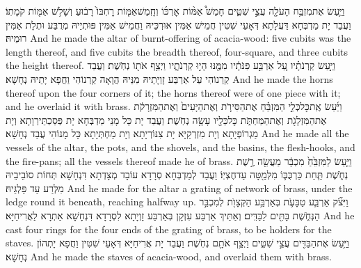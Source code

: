 \newperek
{}
{וַיַּ֛עַשׂ אֶת\maqqaf מִזְבַּ֥ח הָעֹלָ֖ה עֲצֵ֣י שִׁטִּ֑ים חָמֵשׁ֩ אַמּ֨וֹת אׇרְכּ֜וֹ וְחָֽמֵשׁ\maqqaf אַמּ֤וֹת רׇחְבּוֹ֙ רָב֔וּעַ וְשָׁלֹ֥שׁ אַמּ֖וֹת קֹמָתֽוֹ׃}
{וַעֲבַד יָת מַדְבְּחָא דַּעֲלָתָא דְּאָעֵי שִׁטִּין חֲמֵישׁ אַמִּין אוּרְכֵּיהּ וַחֲמֵישׁ אַמִּין פּוּתְיֵיהּ מְרֻבַּע וּתְלָת אַמִּין רוּמֵיהּ׃}
{And he made the altar of burnt-offering of acacia-wood: five cubits was the length thereof, and five cubits the breadth thereof, four-square, and three cubits the height thereof.}{}
{וַיַּ֣עַשׂ קַרְנֹתָ֗יו עַ֚ל אַרְבַּ֣ע פִּנֹּתָ֔יו מִמֶּ֖נּוּ הָי֣וּ קַרְנֹתָ֑יו וַיְצַ֥ף אֹת֖וֹ נְחֹֽשֶׁת׃}
{וַעֲבַד קַרְנוֹהִי עַל אַרְבַּע זָוְיָתֵיהּ מִנֵּיהּ הֲוָאָה קַרְנוֹהִי וַחֲפָא יָתֵיהּ נְחָשָׁא׃}
{And he made the horns thereof upon the four corners of it; the horns thereof were of one piece with it; and he overlaid it with brass.}{}
{וַיַּ֜עַשׂ אֶֽת\maqqaf כׇּל\maqqaf כְּלֵ֣י הַמִּזְבֵּ֗חַ אֶת\maqqaf הַסִּירֹ֤ת וְאֶת\maqqaf הַיָּעִים֙ וְאֶת\maqqaf הַמִּזְרָקֹ֔ת אֶת\maqqaf הַמִּזְלָגֹ֖ת וְאֶת\maqqaf הַמַּחְתֹּ֑ת כׇּל\maqqaf כֵּלָ֖יו עָשָׂ֥ה נְחֹֽשֶׁת׃}
{וַעֲבַד יָת כָּל מָנֵי מַדְבְּחָא יָת פְּסַכְתֵּירְוָתָא וְיָת מַגְרוֹפְיָתָא וְיָת מִזְרְקַיָּא יָת צִנּוֹרְיָתָא וְיָת מַחְתְּיָתָא כָּל מָנוֹהִי עֲבַד נְחָשָׁא׃}
{And he made all the vessels of the altar, the pots, and the shovels, and the basins, the flesh-hooks, and the fire-pans; all the vessels thereof made he of brass.}{}
{וַיַּ֤עַשׂ לַמִּזְבֵּ֙חַ֙ מִכְבָּ֔ר מַעֲשֵׂ֖ה רֶ֣שֶׁת נְחֹ֑שֶׁת תַּ֧חַת כַּרְכֻּבּ֛וֹ מִלְּמַ֖טָּה עַד\maqqaf חֶצְיֽוֹ׃}
{וַעֲבַד לְמַדְבְּחָא סְרָדָא עוֹבָד מְצָדְתָא דִּנְחָשָׁא תְּחוֹת סוֹבֵיבֵיהּ מִלְּרַע עַד פַּלְגֵּיהּ׃}
{And he made for the altar a grating of network of brass, under the ledge round it beneath, reaching halfway up.}{}
{וַיִּצֹ֞ק אַרְבַּ֧ע טַבָּעֹ֛ת בְּאַרְבַּ֥ע הַקְּצָוֺ֖ת לְמִכְבַּ֣ר הַנְּחֹ֑שֶׁת בָּתִּ֖ים לַבַּדִּֽים׃}
{וְאַתֵּיךְ אַרְבַּע עִזְקָן בְּאַרְבַּע זָוְיָתָא לִסְרָדָא דִּנְחָשָׁא אַתְרָא לַאֲרִיחַיָּא׃}
{And he cast four rings for the four ends of the grating of brass, to be holders for the staves.}{}
{וַיַּ֥עַשׂ אֶת\maqqaf הַבַּדִּ֖ים עֲצֵ֣י שִׁטִּ֑ים וַיְצַ֥ף אֹתָ֖ם נְחֹֽשֶׁת׃}
{וַעֲבַד יָת אֲרִיחַיָּא דְּאָעֵי שִׁטִּין וַחֲפָא יָתְהוֹן נְחָשָׁא׃}
{And he made the staves of acacia-wood, and overlaid them with brass.}{}
